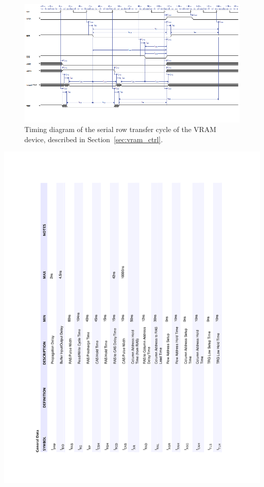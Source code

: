 \documentclass[titlepage]{scrartcl}
\begin{document}
	\begin{figure}[h!]
	\vspace{-2cm}
	\centerline{\includegraphics[width=25cm, angle=90, origin=c]{img/vram_serial.png}}
		\vspace{1cm}
                	\caption{Timing diagram of the serial row transfer cycle of the VRAM device, described in Section~\ref{sec:vram_ctrl}.}
               	\label{fig:vram_serial}
	\end{figure}

	\clearpage

	\begin{table}[h!]
	\vspace{-2cm}
	\centerline{\includegraphics[width=20cm]{img/vram_serial_table.pdf}}
		\vspace{0cm}
                	\caption{Table of constraints of the serial row transfer cycle of the VRAM device, shown in Figure~\ref{fig:vram_serial} and described in Section~\ref{sec:vram_ctrl}.}
               	\label{tab:vram_serial}
	\end{table}
\end{document}
